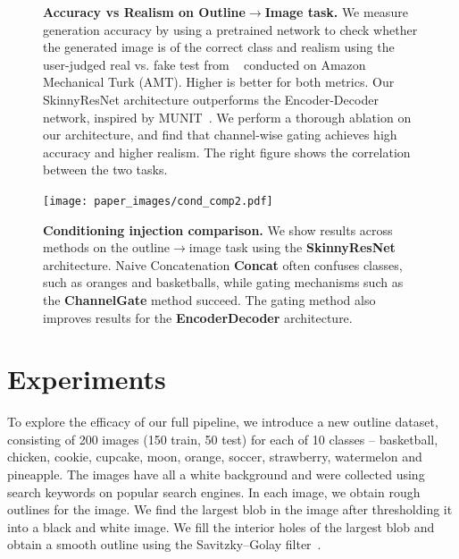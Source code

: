 \begin{figure}[ht!]
\begin{minipage}[]{0.49\linewidth}
  \end{minipage}
  \caption{\small {\bf Accuracy vs Realism on Outline$\rightarrow$Image task.} We measure generation accuracy by using a pretrained network to check whether the generated image is of the correct class and realism using the user-judged real vs. fake test from ~\cite{zhang2016colorful,isola2016image2image} conducted on Amazon Mechanical Turk (AMT). Higher is better for both metrics. Our SkinnyResNet architecture outperforms the Encoder-Decoder network, inspired by MUNIT~\cite{huang2018multimodal}. We perform a thorough ablation on our architecture, and find that channel-wise gating achieves high accuracy and higher realism. The right figure shows the correlation between the two tasks.
  \vspace{-4mm}
  }
  \vspace{-3mm}
  \label{fig:acc_vs_real}
\end{figure}


\begin{figure}[t]
    \centering
    \texttt{[image: paper\_images/cond\_comp2.pdf]}
    \caption{{\bf Conditioning injection comparison.} We show results across methods on the outline$\rightarrow$image task using the \textbf{SkinnyResNet} architecture. Naive Concatenation \textbf{Concat} often confuses classes, such as oranges and basketballs, while gating mechanisms such as the \textbf{ChannelGate} method succeed. The gating method also improves results for the \textbf{EncoderDecoder} architecture. \label{fig:alg_comp} }
    \vspace{-4mm}
\end{figure}


\section{Experiments}
\label{sec:experiments}
To explore the efficacy of our full pipeline, we introduce a new outline dataset, consisting of 200 images (150 train, 50 test) for each of 10 classes -- basketball, chicken, cookie, cupcake, moon, orange, soccer, strawberry,  watermelon and pineapple. The images have all a white background and were collected using search keywords on popular search engines.
In each image, we obtain rough outlines for the image. We find the largest blob in the image after thresholding it into a black and white image. We fill the interior holes of the largest blob and obtain a smooth outline using the Savitzky–Golay filter~\cite{savitzky1964smoothing}.


